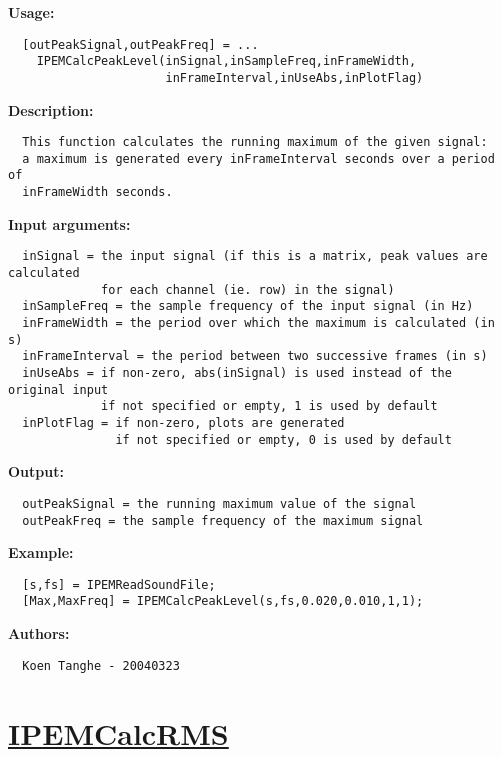 \textbf{Usage:}
\begin{verbatim}  [outPeakSignal,outPeakFreq] = ...
    IPEMCalcPeakLevel(inSignal,inSampleFreq,inFrameWidth,
                      inFrameInterval,inUseAbs,inPlotFlag)

\end{verbatim}
\textbf{Description:}
\begin{verbatim}  This function calculates the running maximum of the given signal:
  a maximum is generated every inFrameInterval seconds over a period of  
  inFrameWidth seconds.

\end{verbatim}
\textbf{Input arguments:}
\begin{verbatim}  inSignal = the input signal (if this is a matrix, peak values are calculated
             for each channel (ie. row) in the signal)
  inSampleFreq = the sample frequency of the input signal (in Hz)
  inFrameWidth = the period over which the maximum is calculated (in s)
  inFrameInterval = the period between two successive frames (in s)
  inUseAbs = if non-zero, abs(inSignal) is used instead of the original input
             if not specified or empty, 1 is used by default
  inPlotFlag = if non-zero, plots are generated
               if not specified or empty, 0 is used by default

\end{verbatim}
\textbf{Output:}
\begin{verbatim}  outPeakSignal = the running maximum value of the signal
  outPeakFreq = the sample frequency of the maximum signal

\end{verbatim}
\textbf{Example:}
\begin{verbatim}  [s,fs] = IPEMReadSoundFile;
  [Max,MaxFreq] = IPEMCalcPeakLevel(s,fs,0.020,0.010,1,1);

\end{verbatim}
\textbf{Authors:}
\begin{verbatim}  Koen Tanghe - 20040323
\end{verbatim}


\newpage
\section*{\hyperlink{Concepts:IPEMCalcRMS}{IPEMCalcRMS}}
\hypertarget{FuncRef:IPEMCalcRMS}{}

